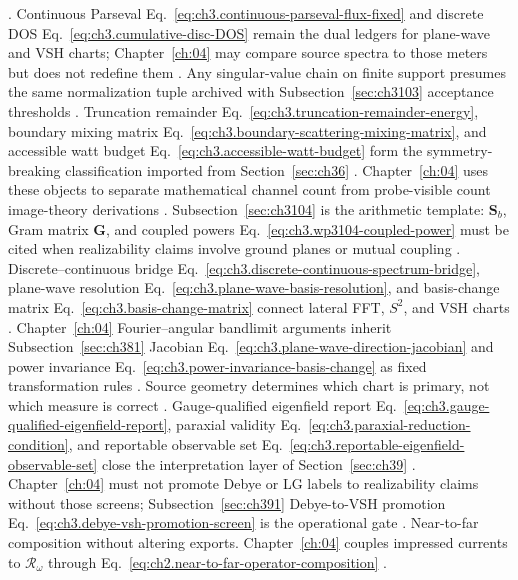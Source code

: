 \cite{poynting1884}. Continuous Parseval Eq.~\eqref{eq:ch3.continuous-parseval-flux-fixed} and discrete DOS
Eq.~\eqref{eq:ch3.cumulative-disc-DOS} remain the dual ledgers for plane-wave and VSH charts; Chapter~\ref{ch:04} may compare source
spectra to those meters but does not redefine them \cite{hansen1988}. Any singular-value chain on finite support presumes
the same normalization tuple archived with Subsection~\ref{sec:ch3103} acceptance thresholds \cite{harrington2001}.
Truncation remainder Eq.~\eqref{eq:ch3.truncation-remainder-energy}, boundary mixing matrix
Eq.~\eqref{eq:ch3.boundary-scattering-mixing-matrix}, and accessible watt budget Eq.~\eqref{eq:ch3.accessible-watt-budget} form the
symmetry-breaking classification imported from Section~\ref{sec:ch36} \cite{harrington2001}. Chapter~\ref{ch:04} uses these objects to
separate mathematical channel count from probe-visible count image-theory derivations \cite{jackson1999}.
Subsection~\ref{sec:ch3104} is the arithmetic template: \(\mathbf{S}_{b}\), Gram matrix \(\mathbf{G}\), and coupled powers
Eq.~\eqref{eq:ch3.wp3104-coupled-power} must be cited when realizability claims involve ground planes or mutual coupling
\cite{harrington2001}.
Discrete--continuous bridge Eq.~\eqref{eq:ch3.discrete-continuous-spectrum-bridge}, plane-wave resolution
Eq.~\eqref{eq:ch3.plane-wave-basis-resolution}, and basis-change matrix Eq.~\eqref{eq:ch3.basis-change-matrix} connect lateral FFT,
\(S^{2}\), and VSH charts \cite{jackson1999}. Chapter~\ref{ch:04} Fourier--angular bandlimit arguments inherit
Subsection~\ref{sec:ch381} Jacobian Eq.~\eqref{eq:ch3.plane-wave-direction-jacobian} and power invariance
Eq.~\eqref{eq:ch3.power-invariance-basis-change} as fixed transformation rules \cite{harrington2001}. Source geometry
determines which chart is primary, not which measure is correct \cite{stratton1941}.
Gauge-qualified eigenfield report Eq.~\eqref{eq:ch3.gauge-qualified-eigenfield-report}, paraxial validity
Eq.~\eqref{eq:ch3.paraxial-reduction-condition}, and reportable observable set Eq.~\eqref{eq:ch3.reportable-eigenfield-observable-set}
close the interpretation layer of Section~\ref{sec:ch39} \cite{belinfante1940}. Chapter~\ref{ch:04} must not promote
Debye or LG labels to realizability claims without those screens; Subsection~\ref{sec:ch391} Debye-to-VSH promotion
Eq.~\eqref{eq:ch3.debye-vsh-promotion-screen} is the operational gate \cite{tai1994}.
Near-to-far composition without altering exports. Chapter~\ref{ch:04} couples impressed currents to \(\mathcal{R}_\omega\) through Eq.~\eqref{eq:ch2.near-to-far-operator-composition} \cite{stratton1941}.
